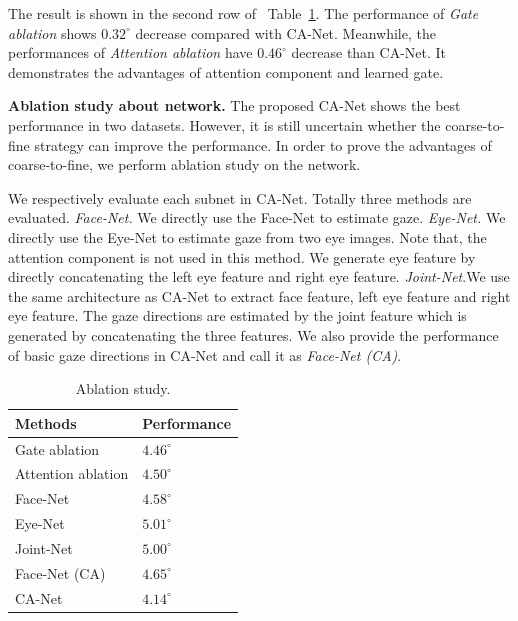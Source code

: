 \documentclass[letterpaper]{article} %
\def\bm #1{\boldsymbol{#1}}%
\newcommand{\Tref}[1]{Table~\ref{#1}}
\begin{document}
The result is shown in the second row of ~\Tref{table:ablation}.
The performance of \emph{Gate ablation} shows $0.32^{\circ}$ decrease compared with CA-Net.
Meanwhile, the performances of \emph{Attention ablation} have $0.46^{\circ}$ decrease than CA-Net.
It demonstrates the advantages of attention component and learned gate.

\textbf{Ablation study about network.}
The proposed CA-Net shows the best performance in two datasets.
However, it is still uncertain whether the coarse-to-fine strategy can improve the performance.
In order to prove the advantages of coarse-to-fine, we perform ablation study on the network.

We respectively evaluate each subnet in CA-Net. Totally three methods are evaluated.
\emph{Face-Net.} We directly use the Face-Net to estimate gaze.
\emph{Eye-Net.} We directly use the Eye-Net to estimate gaze from two eye images. Note that, the attention component is not used in this method. We generate eye feature by directly concatenating the left eye feature and right eye feature.
\emph{Joint-Net}.We use the same architecture as CA-Net to extract face feature, left eye feature and right eye feature. The gaze directions are estimated by the joint feature which is generated by concatenating the three features.
We also provide the performance of basic gaze directions in CA-Net and call it as \emph{Face-Net (CA)}.


\begin{table}[t]
	\renewcommand\arraystretch{1.3}
	\normalsize
	\caption{Ablation study.}
	\begin{center}
		\begin{tabular}{|p{4.0cm}<{\centering}|p{3.0cm}<{\centering}|}
			\hline
			Methods & Performance\\
			\hline
			Gate ablation 					&$4.46^{\circ}$				\\
			Attention ablation 			&$4.50^{\circ}$				\\

			\hline
			Face-Net				&$4.58^{\circ}$					\\
			Eye-Net				&$5.01^{\circ}$					\\
			Joint-Net		&$5.00^{\circ}$					\\
			Face-Net (CA)	&$4.65^{\circ}$	\\
			\hline
			CA-Net					&$\bm{4.14^{\circ}}$		\\
			\hline
		\end{tabular}
	\end{center}
	\label{table:ablation}
\end{table}
\end{document}
